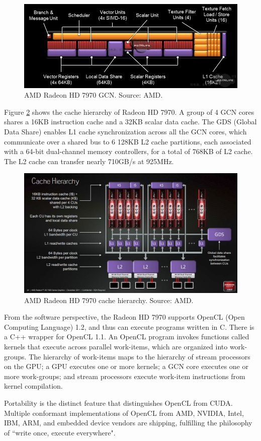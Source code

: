 \begin{figure}
\centering
\includegraphics[width=\textwidth]{GPU/RadeonHD7970GCN.png}
\caption{AMD Radeon HD 7970 GCN. Source: AMD.}
\label{GPU:RadeonHD7970GCN}
\end{figure}

Figure \ref{GPU:RadeonHD7970CacheHierarchy} shows the cache hierarchy of Radeon HD 7970. A group of 4 GCN cores shares a 16KB instruction cache and a 32KB scalar data cache. The GDS (Global Data Share) enables L1 cache synchronization across all the GCN cores, which communicate over a shared bus to 6 128KB L2 cache partitions, each associated with a 64-bit dual-channel memory controllers, for a total of 768KB of L2 cache. The L2 cache can transfer nearly 710GB/s at 925MHz.

\begin{figure}
\centering
\includegraphics[width=\textwidth]{GPU/RadeonHD7970CacheHierarchy.jpg}
\caption{AMD Radeon HD 7970 cache hierarchy. Source: AMD.}
\label{GPU:RadeonHD7970CacheHierarchy}
\end{figure}

From the software perspective, the Radeon HD 7970 supports OpenCL (Open Computing Language) 1.2, and thus can execute programs written in C. There is a C++ wrapper for OpenCL 1.1. An OpenCL program invokes functions called kernels that execute across parallel work-items, which are organized into work-groups. The hierarchy of work-items maps to the hierarchy of stream processors on the GPU; a GPU executes one or more kernels; a GCN core executes one or more work-groups; and stream processors execute work-item instructions from kernel compilation.

Portability is the distinct feature that distinguishes OpenCL from CUDA. Multiple conformant implementations of OpenCL from AMD, NVIDIA, Intel, IBM, ARM, and embedded device vendors are shipping, fulfilling the philosophy of ``write once, execute everywhere".

\chapterend
